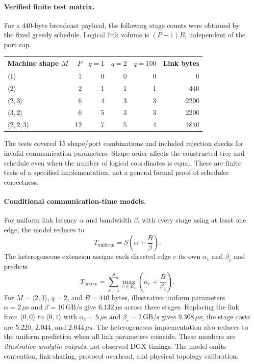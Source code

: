 \documentclass[11pt]{article}
\begin{document}
\paragraph{Verified finite test matrix.}
For a 440-byte broadcast payload, the following stage counts were obtained by the fixed greedy schedule. Logical link volume is $(P-1)B$, independent of the port cap.
\begin{center}\small
\begin{tabular}{lrrrrr}\toprule
Machine shape $M$ & $P$ & $q=1$ & $q=2$ & $q=100$ & Link bytes\\\midrule
$\langle1\rangle$ & 1 & 0 & 0 & 0 & 0\\
$\langle2\rangle$ & 2 & 1 & 1 & 1 & 440\\
$\langle2,3\rangle$ & 6 & 4 & 3 & 3 & 2200\\
$\langle3,2\rangle$ & 6 & 5 & 3 & 3 & 2200\\
$\langle2,2,3\rangle$ & 12 & 7 & 5 & 4 & 4840\\\bottomrule
\end{tabular}
\end{center}
The tests covered 15 shape/port combinations and included rejection checks for invalid communication parameters. Shape order affects the constructed tree and schedule even when the number of logical coordinates is equal. These are finite tests of a specified implementation, not a general formal proof of scheduler correctness.

\paragraph{Conditional communication-time models.}
For uniform link latency $\alpha$ and bandwidth $\beta$, with every stage using at least one edge, the model reduces to
\begin{equation}
T_{\mathrm{uniform}}=S\left(\alpha+\frac{B}{\beta}\right).
\end{equation}
The heterogeneous extension assigns each directed edge $e$ its own $\alpha_e$ and $\beta_e$ and predicts
\begin{equation}\label{eq:v14hetero}
T_{\mathrm{hetero}}=\sum_{s=1}^{S}\max_{e\in E_s}\left(\alpha_e+\frac{B}{\beta_e}\right).
\end{equation}
For $M=\langle2,3\rangle$, $q=2$, and $B=440$ bytes, illustrative uniform parameters $\alpha=2\,\mu\mathrm{s}$ and $\beta=10\,\mathrm{GB/s}$ give $6.132\,\mu\mathrm{s}$ across three stages. Replacing the link from $\langle0,0\rangle$ to $\langle0,1\rangle$ with $\alpha_e=5\,\mu\mathrm{s}$ and $\beta_e=2\,\mathrm{GB/s}$ gives $9.308\,\mu\mathrm{s}$; the stage costs are $5.220$, $2.044$, and $2.044\,\mu\mathrm{s}$. The heterogeneous implementation also reduces to the uniform prediction when all link parameters coincide. These numbers are \emph{illustrative analytic outputs}, not observed DGX timings. The model omits contention, link-sharing, protocol overhead, and physical topology calibration.
\end{document}
